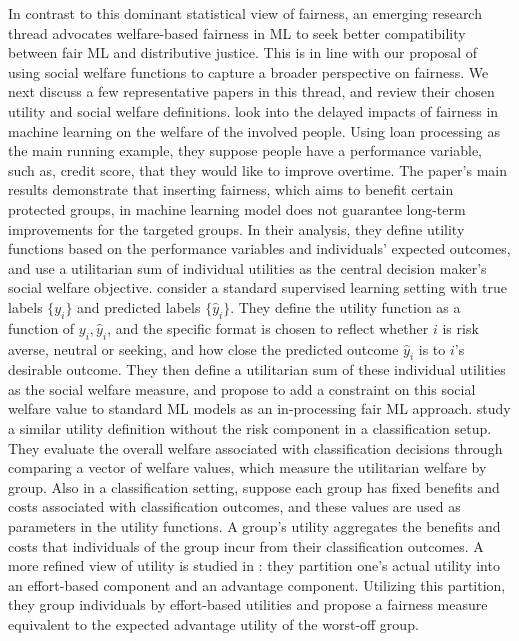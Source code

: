 \documentclass{article}[11pt]
\begin{document}
In contrast to this dominant statistical view of fairness, an emerging research thread advocates welfare-based fairness in ML to seek better compatibility between fair ML and distributive justice. This is in line with our proposal of using social welfare functions to capture a broader perspective on fairness. We next discuss a few representative papers in this thread, and review their chosen utility and social welfare definitions. \cite{liu2018delayed} look into the delayed impacts of fairness in machine learning on the welfare of the involved people. Using loan processing as the main running example, they suppose people have a performance variable, such as, credit score, that they would like to improve overtime. The paper's main results demonstrate that inserting fairness, which aims to benefit certain protected groups, in machine learning model does not guarantee long-term improvements for the targeted groups. In their analysis, they define utility functions based on the performance variables and individuals' expected outcomes, and use a utilitarian sum of individual utilities as the central decision maker's social welfare objective. \cite{heidari2018fairness} consider a standard supervised learning setting with true labels $\{y_i\}$ and predicted labels $\{\hat{y}_i\}$. They define the utility function as a function of $y_i, \hat{y}_i$, and the specific format is chosen to reflect whether $i$ is risk averse, neutral or seeking, and how close the predicted outcome $\hat{y}_i$ is to $i$'s desirable outcome. They then define a utilitarian sum of these individual utilities as the social welfare measure, and propose to add a constraint on this social welfare value to standard ML models as an in-processing fair ML approach. \cite{hu2020fair} study a similar utility definition without the risk component in a classification setup. They evaluate the overall welfare associated with classification decisions through comparing a vector of welfare values, which measure the utilitarian welfare by group. Also in a classification setting, \cite{corbett2018measure} suppose each group has fixed benefits and costs associated with classification outcomes, and these values are used as parameters in the utility functions. A group's utility aggregates the benefits and costs that individuals of the group incur from their classification outcomes. A more refined view of utility is studied in \cite{heidari2019moral}: they partition one's actual utility into an effort-based component and an advantage component. Utilizing this partition, they group individuals by effort-based utilities and propose a fairness measure equivalent to the expected advantage utility of the worst-off group. 
\end{document}
